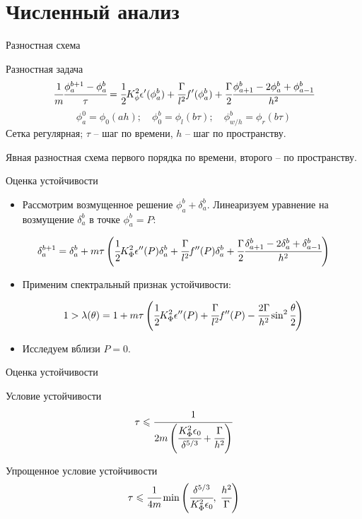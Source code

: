 \documentclass[aspectratio=169]{beamer}
\begin{document}
\section{Численный анализ}

\begin{frame}{Разностная схема}
\begin{block}{Разностная задача}
	$$\cfrac{1}{m} \cfrac{\phi_a^{b + 1} - \phi_a^b}{\tau} = \cfrac{1}{2} K_\phi^2
	\epsilon'(\phi_a^b) + \cfrac{\Gamma}{l^2} f'(\phi_a^b) + \cfrac{\Gamma}{2}
	\cfrac{\phi_{a + 1}^b - 2 \phi_a^b + \phi_{a - 1}^b}{h^2}$$
	$$\phi_a^0 = \phi_0(ah); \quad \phi_0^b = \phi_l(b \tau); \quad \phi_{w/h}^b = \phi_r(b \tau)$$
	Сетка регулярная; $\tau$ -- шаг по времени, $h$ -- шаг по пространству.
\end{block}
Явная разностная схема первого порядка по времени, второго -- по пространству.
\end{frame}


\begin{frame}{Оценка устойчивости}
\begin{itemize}
\item Рассмотрим возмущенное решение $\phi_a^b + \delta_a^b$. Линеаризуем уравнение на возмущение
$\delta_a^b$ в точке $\phi_a^b = P$:
\end{itemize}
$$\delta_a^{b + 1} = \delta_a^b + m \tau \left( \cfrac{1}{2} K_\Phi^2 \epsilon''(P) \delta_a^b +
\cfrac{\Gamma}{l^2} f''(P) \delta_a^b + \cfrac{\Gamma}{2} \cfrac{\delta_{a + 1}^b - 2 \delta_a^b +
\delta_{a - 1}^b}{h^2} \right)$$
\begin{itemize}
\item Применим спектральный признак устойчивости:
\end{itemize}
$$1 > \lambda(\theta) = 1 + m \tau \left( \cfrac{1}{2} K_\Phi^2 \epsilon''(P) +
\cfrac{\Gamma}{l^2} f''(P) - \cfrac{2 \Gamma}{h^2} \sin^2 \cfrac{\theta}{2} \right)$$
\begin{itemize}
\item Исследуем вблизи $P = 0$.
\end{itemize}
\end{frame}


\begin{frame}{Оценка устойчивости}
\begin{block}{Условие устойчивости}
	$$\tau \leqslant \cfrac{1}{2m \left( \cfrac{K_\Phi^2 \epsilon_0}{\delta^{5/3}} +
	\cfrac{\Gamma}{h^2} \right)}$$
\end{block}
\begin{block}{Упрощенное условие устойчивости}
	$$\tau \leqslant \cfrac{1}{4m} \min \left(\cfrac{\delta^{5/3}}{K_\Phi^2 \epsilon_0}, \;
	\cfrac{h^2}{\Gamma} \right)$$
\end{block}
\end{frame}
\end{document}
